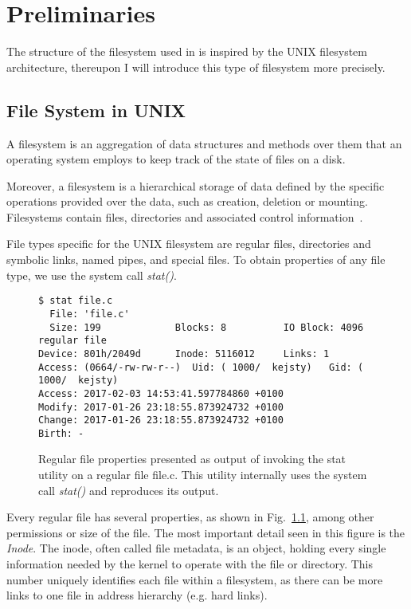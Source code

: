 
\chapter{Preliminaries} \label{chap:prelim}

The structure of the filesystem used in \divine is inspired by the UNIX filesystem architecture, thereupon I will introduce this type of filesystem more precisely.

\section{File System in UNIX}

A filesystem is an aggregation of data structures and methods over them that an operating system employs to keep track of the state of files on a disk.

Moreover, a filesystem is a hierarchical storage of data defined by the specific operations provided over the data, such as creation, deletion or mounting. Filesystems contain files, directories and associated control information~\cite{LinuxKernelDev}. 

File types specific for the UNIX filesystem are regular files, directories and symbolic links, named pipes, and special files. 
To obtain properties of any file type, we use the system call \textit{stat()}. 
\begin{figure}[h!]
\begin{lstlisting}[style=DOS]
$ stat file.c 
  File: 'file.c'
  Size: 199             Blocks: 8          IO Block: 4096   regular file
Device: 801h/2049d      Inode: 5116012     Links: 1
Access: (0664/-rw-rw-r--)  Uid: ( 1000/  kejsty)   Gid: ( 1000/  kejsty)
Access: 2017-02-03 14:53:41.597784860 +0100
Modify: 2017-01-26 23:18:55.873924732 +0100
Change: 2017-01-26 23:18:55.873924732 +0100
Birth: -
\end{lstlisting}
\caption{
      Regular file properties presented as output of invoking the stat utility on a regular file file.c. This utility internally uses the system call \textit{stat()} and reproduces its output.
    }
  \label{fig:regFileProp}
\end{figure}


Every regular file has several properties, as shown in Fig.~\ref{fig:regFileProp}, among other permissions or size of the file. The most important detail seen in this figure is the \textit{Inode}. The inode, often called file metadata, is an object, holding every single information needed by the kernel to operate with the file or directory. This number uniquely identifies each file within a filesystem, as there can be more links to one file in address hierarchy (e.g. hard links).


